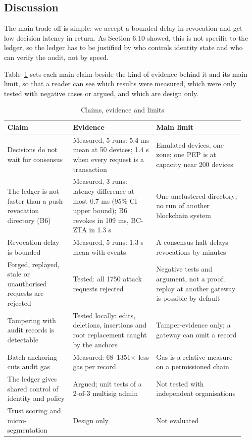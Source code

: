 \documentclass[a4paper,5p,times,twocolumn,number,sort&compress]{elsarticle}
\begin{document}
\subsection{Discussion}

The main trade-off is simple: we accept a bounded delay in revocation and get low decision latency in return. As Section 6.10 showed, this is not specific to the ledger, so the ledger has to be justified by who controls identity state and who can verify the audit, not by speed. 

Table~\ref{tab:claims} sets each main claim beside the kind of evidence behind it and its main limit, so that a reader can see which results were measured, which were only tested with negative cases or argued, and which are design only.

\begin{table}[!t]
\caption{Claims, evidence and limits}
\label{tab:claims}
\footnotesize
\renewcommand{\arraystretch}{0.92}\setlength{\tabcolsep}{2pt}
\begin{tabular}{>{\raggedright\arraybackslash}p{0.264\linewidth}>{\raggedright\arraybackslash}p{0.332\linewidth}>{\raggedright\arraybackslash}p{0.351\linewidth}}
\toprule
\textbf{Claim} & \textbf{Evidence} & \textbf{Main limit} \\
\midrule
Decisions do not wait for consensus & Measured, 5 runs: 5.4 ms mean at 50 devices; 1.4 s when every request is a transaction & Emulated devices, one zone; one PEP is at capacity near 200 devices \\
The ledger is not faster than a push-revocation directory (B6) & Measured, 3 runs: latency difference at most 0.7 ms (95\% CI upper bound); B6 revokes in 109 ms, BC-ZTA in 1.3 s & One unclustered directory; no run of another blockchain system \\
Revocation delay is bounded & Measured, 5 runs: 1.3 s mean with events & A consensus halt delays revocations by minutes \\
Forged, replayed, stale or unauthorised requests are rejected & Tested: all 1750 attack requests rejected & Negative tests and argument, not a proof; replay at another gateway is possible by default \\
Tampering with audit records is detectable & Tested locally: edits, deletions, insertions and root replacement caught by the anchors & Tamper-evidence only; a gateway can omit a record \\
Batch anchoring cuts audit gas & Measured: 68--1351$\times$ less gas per record & Gas is a relative measure on a permissioned chain \\
The ledger gives shared control of identity and policy & Argued; unit tests of a 2-of-3 multisig admin & Not tested with independent organisations \\
Trust scoring and micro-segmentation & Design only & Not evaluated \\
\bottomrule
\end{tabular}
\par\vspace{2pt}{\scriptsize Evidence type: measured = repeated runs on the testbed; tested = scripted cases; argued = reasoning under stated assumptions.}
\end{table}
\end{document}
